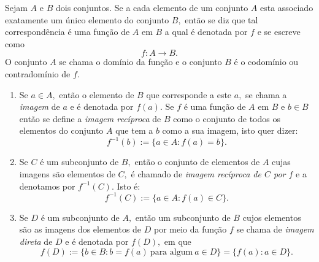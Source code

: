 \begin{frame}
\begin{defi}[Função]
 Sejam $A$ e $B$ dois conjuntos. Se a cada elemento de um conjunto $A$ esta associado exatamente um único elemento do conjunto $B,$ então se diz que tal correspondência é uma função de $A$ em $B$ a qual é denotada por $f$ e se escreve como
$$
f: A \rightarrow B.
$$ O conjunto $A$ se chama o domínio da função e o conjunto $B$ é o  codomínio ou contradomínio de $f.$ 
\end{defi}
\begin{enumerate}
\item Se $a\in A,$ então o elemento de $B$ que corresponde a este $a,$ se chama a {\it imagem} de $a$ e é denotada por $f(a).$ Se $f$ é uma função de $A$ em $B$ e $b\in B$  então se define a {\it imagem recíproca} de $B$ como o conjunto de todos os elementos do conjunto $A$ que tem a $b$ como a sua imagem, isto quer dizer:
$$
f^{-1}(b):= \{ a\in A : f(a) = b \}.
$$
\item Se $C$ é um subconjunto de $B,$ então o conjunto de elementos de $A$ cujas imagens são elementos de $C,$ é chamado de {\it imagem recíproca de $C$ por $f$}  e a denotamos por  $f^{-1}(C).$ Isto é:
$$
f^{-1}(C) := \{ a\in A : f(a) \in C \}.
$$  
\item Se $D$ é um subconjunto de $A,$ então um subconjunto de $B$ cujos elementos são as imagens dos elementos de $D$ por meio da função $f$ se chama de {\it imagem direta} de $D$ e é denotada por $f(D),$ em que 
$$
f(D):=\{ b\in B :  b = f(a) \ \text{para algum} \ a\in D\} =  \{ f(a): a \in D \}.
$$
\end{enumerate}
\end{frame}



